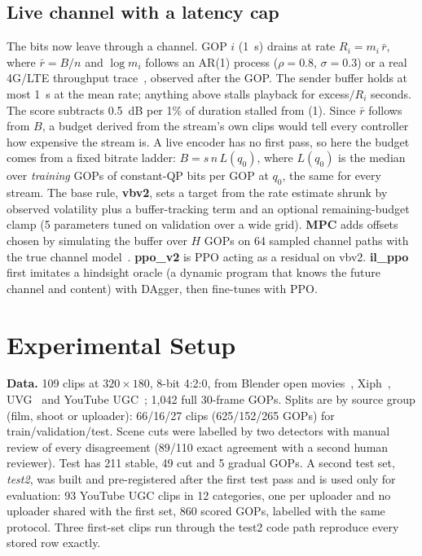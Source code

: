 \documentclass[conference]{IEEEtran}
\begin{document}
\subsection{Live channel with a latency cap}
The bits now leave through a channel. GOP $i$ (1~s) drains at rate $R_i = m_i\,\bar r$, where $\bar r = B/n$ and $\log m_i$ follows an AR(1) process ($\rho{=}0.8$, $\sigma{=}0.3$) or a real 4G/LTE throughput trace~\cite{vanderhooft2016lte}, observed after the GOP. The sender buffer holds at most 1~s at the mean rate; anything above stalls playback for excess$/R_i$ seconds. The score subtracts 0.5~dB per 1\% of duration stalled from (1). Since $\bar r$ follows from $B$, a budget derived from the stream's own clips would tell every controller how expensive the stream is. A live encoder has no first pass, so here the budget comes from a fixed bitrate ladder: $B = s\, n\, L(q_0)$, where $L(q_0)$ is the median over \emph{training} GOPs of constant-QP bits per GOP at $q_0$, the same for every stream. The base rule, \textbf{vbv2}, sets a target from the rate estimate shrunk by observed volatility plus a buffer-tracking term and an optional remaining-budget clamp (5 parameters tuned on validation over a wide grid). \textbf{MPC} adds offsets chosen by simulating the buffer over $H$ GOPs on 64 sampled channel paths with the true channel model~\cite{yin2015mpc}. \textbf{ppo\_v2} is PPO acting as a residual on vbv2. \textbf{il\_ppo} first imitates a hindsight oracle (a dynamic program that knows the future channel and content) with DAgger, then fine-tunes with PPO.

\section{Experimental Setup}
\textbf{Data.} 109 clips at $320{\times}180$, 8-bit 4:2:0, from Blender open movies~\cite{blender}, Xiph~\cite{xiph}, UVG~\cite{mercat2020uvg} and YouTube UGC~\cite{wang2019ugc}; 1{,}042 full 30-frame GOPs. Splits are by source group (film, shoot or uploader): 66/16/27 clips (625/152/265 GOPs) for train/validation/test. Scene cuts were labelled by two detectors with manual review of every disagreement (89/110 exact agreement with a second human reviewer). Test has 211 stable, 49 cut and 5 gradual GOPs. A second test set, \emph{test2}, was built and pre-registered after the first test pass and is used only for evaluation: 93 YouTube UGC clips in 12 categories, one per uploader and no uploader shared with the first set, 860 scored GOPs, labelled with the same protocol. Three first-set clips run through the test2 code path reproduce every stored row exactly.
\end{document}

